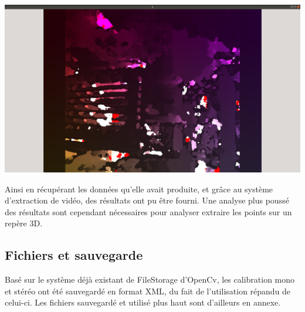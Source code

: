 \documentclass{article}
\begin{document}
\includegraphics[width=\linewidth]{img/d_sgbm.png}

Ainsi en récupérant les données qu'elle avait produite, et grâce au système d'extraction de vidéo, des résultats ont pu être fourni. 
Une analyse plus poussé des résultats sont cependant nécessaires pour analyser extraire les points sur un repère 3D.

    \newpage
\subsection{Fichiers et sauvegarde}

Basé sur le système déjà existant de FileStorage d'OpenCv, les calibration mono et stéréo ont été sauvegardé en format XML, du fait de l'utilisation répandu de celui-ci.
Les fichiers sauvegardé et utilisé plus haut sont d'ailleurs en annexe.

    

\end{document}
